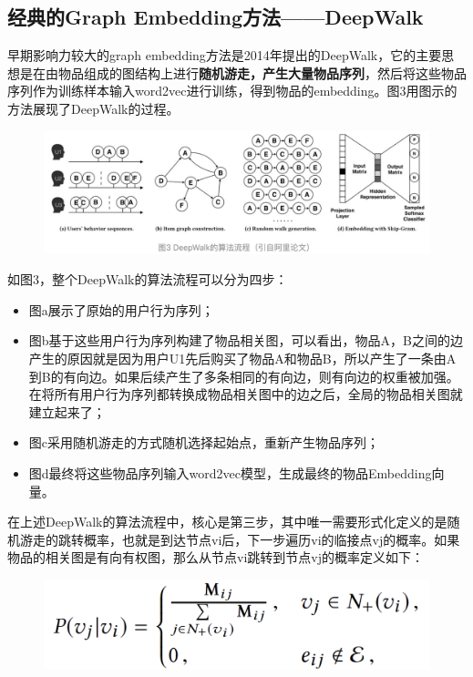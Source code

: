 \documentclass[12pt]{article}
\begin{document}
\subsection{经典的Graph Embedding方法——DeepWalk}
早期影响力较大的graph embedding方法是2014年提出的DeepWalk，它的主要思想是在由物品组成的图结构上进行\textbf{随机游走，产生大量物品序列}，然后将这些物品序列作为训练样本输入word2vec进行训练，得到物品的embedding。图3用图示的方法展现了DeepWalk的过程。
\begin{figure}[H]
    \centering
    \includegraphics[width=1\textwidth]{fig/Graph_Embedding_Deep_Walk_Example.png}
\end{figure}

如图3，整个DeepWalk的算法流程可以分为四步：
\begin{itemize}
\setlength{\itemsep}{0pt}
\setlength{\parsep}{0pt}
\setlength{\parskip}{0pt}
    \item 图a展示了原始的用户行为序列；
    \item 图b基于这些用户行为序列构建了物品相关图，可以看出，物品A，B之间的边产生的原因就是因为用户U1先后购买了物品A和物品B，所以产生了一条由A到B的有向边。如果后续产生了多条相同的有向边，则有向边的权重被加强。在将所有用户行为序列都转换成物品相关图中的边之后，全局的物品相关图就建立起来了；
    \item 图c采用随机游走的方式随机选择起始点，重新产生物品序列；
    \item 图d最终将这些物品序列输入word2vec模型，生成最终的物品Embedding向量。
\end{itemize}

在上述DeepWalk的算法流程中，核心是第三步，其中唯一需要形式化定义的是随机游走的跳转概率，也就是到达节点vi后，下一步遍历vi的临接点vj的概率。如果物品的相关图是有向有权图，那么从节点vi跳转到节点vj的概率定义如下：
\begin{figure}[H]
    \centering
    \includegraphics[width=.6\textwidth]{fig/Graph_Embedding_Deep_Walk_Trans_Prob.png}
\end{figure}
\end{document}

